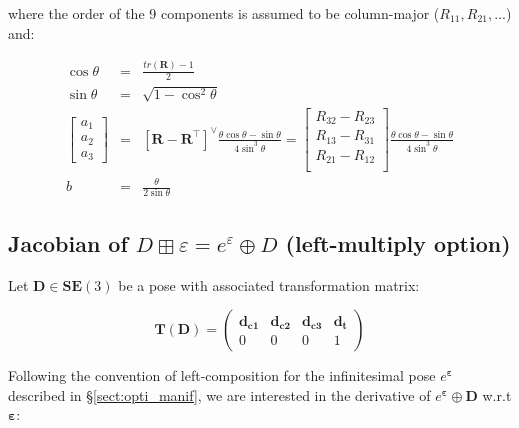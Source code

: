 \documentclass[a4paper,11pt]{report}
\newcommand{\E}{{\bm{\varepsilon}}}
\begin{document}
\noindent where the order of the 9 components is assumed to be column-major ($R_{11},R_{21},...$) and:

\begin{eqnarray}
\cos \theta &=& \frac{tr(\mathbf{R})-1}{2}  \nonumber \\
\sin \theta &=& \sqrt{1-\cos^2 \theta}  \nonumber \\
\left[
\begin{array}{c}
 a_1 \\ a_2 \\ a_3
\end{array}
\right]
 &=& \left[ \mathbf{R} - \mathbf{R}^\top \right]^\vee
\frac{\theta \cos\theta  -\sin \theta  }{4 \sin^3 \theta}
 = \left[
\begin{array}{c}
 R_{32} - R_{23} \\
 R_{13} - R_{31} \\
 R_{21} - R_{12} \\
\end{array}
 \right]
\frac{\theta \cos\theta  -\sin \theta  }{4 \sin^3 \theta}
\nonumber \\
b &=& \frac{\theta}{2 \sin \theta}
\nonumber
\end{eqnarray}



\subsection{Jacobian of $D\boxplus \varepsilon = e^\varepsilon \oplus D$ (left-multiply option)}
\label{sect:jacob_eD}

Let $\mathbf{D} \in \mathbf{SE}(3)$ be a pose with associated transformation matrix:

\begin{equation}
\mathbf{T}(\mathbf{D}) =
\left(
\begin{array}{ccc|c}
 \mathbf{d_{c1}}  & \mathbf{d_{c2}}  & \mathbf{d_{c3}}  & \mathbf{d_{t}}  \\
\hline
  0 & 0 & 0 & 1
\end{array}
\right)
\end{equation}

Following the convention of left-composition for the infinitesimal
pose $e^\E$ described in \S\ref{sect:opti_manif},
we are interested in the derivative of $e^\E \oplus \mathbf{D}$ w.r.t $\E$:
\end{document}
